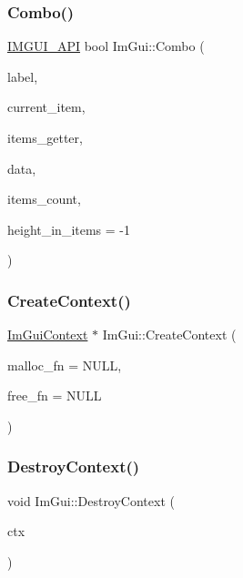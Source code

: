\subsubsection{\texorpdfstring{Combo()}{Combo()}\hspace{0.1cm}{\footnotesize\ttfamily [3/3]}}
{\footnotesize\ttfamily \mbox{\hyperlink{imgui_8h_a43829975e84e45d1149597467a14bbf5}{I\+M\+G\+U\+I\+\_\+\+A\+PI}} bool Im\+Gui\+::\+Combo (\begin{DoxyParamCaption}\item[{const char $\ast$}]{label,  }\item[{int $\ast$}]{current\+\_\+item,  }\item[{bool($\ast$)(void $\ast$data, int idx, const char $\ast$$\ast$out\+\_\+text)}]{items\+\_\+getter,  }\item[{void $\ast$}]{data,  }\item[{int}]{items\+\_\+count,  }\item[{int}]{height\+\_\+in\+\_\+items = {\ttfamily -\/1} }\end{DoxyParamCaption})}

\mbox{\label{namespace_im_gui_a98a4fecf50da4fb3489cee71a72cc577}} 
\subsubsection{\texorpdfstring{Create\+Context()}{CreateContext()}}
{\footnotesize\ttfamily \mbox{\hyperlink{struct_im_gui_context}{Im\+Gui\+Context}} $\ast$ Im\+Gui\+::\+Create\+Context (\begin{DoxyParamCaption}\item[{void $\ast$($\ast$)(size\+\_\+t)}]{malloc\+\_\+fn = {\ttfamily NULL},  }\item[{void($\ast$)(void $\ast$)}]{free\+\_\+fn = {\ttfamily NULL} }\end{DoxyParamCaption})}

\mbox{\label{namespace_im_gui_a344adba8bd84069dc7425b88306411c7}} 
\subsubsection{\texorpdfstring{Destroy\+Context()}{DestroyContext()}}
{\footnotesize\ttfamily void Im\+Gui\+::\+Destroy\+Context (\begin{DoxyParamCaption}\item[{\mbox{\hyperlink{struct_im_gui_context}{Im\+Gui\+Context}} $\ast$}]{ctx }\end{DoxyParamCaption})}

